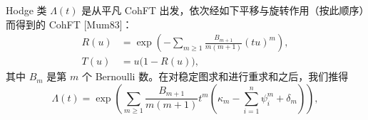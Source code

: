 \begin{theorem}[3.7（Mumford 公式）]
Hodge 类 $\Lambda(t)$ 是从平凡 CohFT 出发，依次经如下平移与旋转作用（按此顺序）而得到的 CohFT [Mum83]：
\begin{equation}
\begin{aligned}
  R(u)&=\exp\left(-\sum_{m\ge1}\frac{B_{m+1}}{m(m+1)}(tu)^{m}\right),\\
  T(u)&=u\big(1-R(u)\big),
\end{aligned}
  \tag{3.47}
\end{equation}
其中 $B_{m}$ 是第 $m$ 个 Bernoulli 数。在对稳定图求和进行重求和之后，我们推得
\begin{equation}
  \Lambda(t)=\exp\left(\sum_{m\ge1}\frac{B_{m+1}}{m(m+1)}t^{m}\left(\kappa_{m}-\sum_{i=1}^{n}\psi_{i}^{m}+\delta_{m}\right)\right),
  \tag{3.48}
\end{equation}
\end{theorem}
